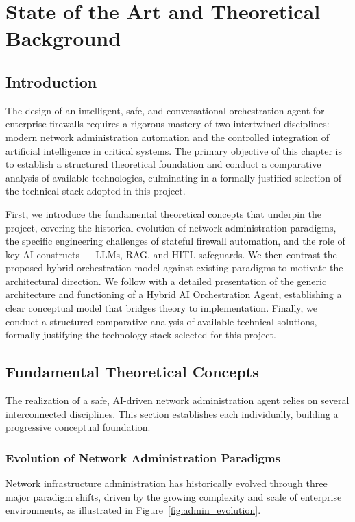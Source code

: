 \chapter{State of the Art and Theoretical Background}

\section{Introduction}
The design of an intelligent, safe, and conversational orchestration agent for enterprise firewalls requires a rigorous mastery of two intertwined disciplines: modern network administration automation and the controlled integration of artificial intelligence in critical systems. The primary objective of this chapter is to establish a structured theoretical foundation and conduct a comparative analysis of available technologies, culminating in a formally justified selection of the technical stack adopted in this project.

First, we introduce the fundamental theoretical concepts that underpin the project, covering the historical evolution of network administration paradigms, the specific engineering challenges of stateful firewall automation, and the role of key AI constructs — LLMs, RAG, and HITL safeguards. We then contrast the proposed hybrid orchestration model against existing paradigms to motivate the architectural direction. We follow with a detailed presentation of the generic architecture and functioning of a Hybrid AI Orchestration Agent, establishing a clear conceptual model that bridges theory to implementation. Finally, we conduct a structured comparative analysis of available technical solutions, formally justifying the technology stack selected for this project.

\section{Fundamental Theoretical Concepts}
The realization of a safe, AI-driven network administration agent relies on several interconnected disciplines. This section establishes each individually, building a progressive conceptual foundation.

\subsection{Evolution of Network Administration Paradigms}
Network infrastructure administration has historically evolved through three major paradigm shifts, driven by the growing complexity and scale of enterprise environments, as illustrated in Figure~\ref{fig:admin_evolution}.

